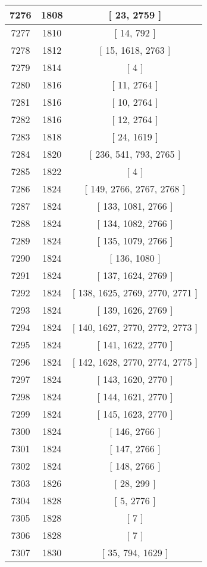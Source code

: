 \begin{center}
\begin{longtable}[H]{|| c c c ||}
\hline
7276 & 1808 & [ 23, 2759 ] \\ 
\hline
7277 & 1810 & [ 14, 792 ] \\ 
\hline
7278 & 1812 & [ 15, 1618, 2763 ] \\ 
\hline
7279 & 1814 & [ 4 ] \\ 
\hline
7280 & 1816 & [ 11, 2764 ] \\ 
\hline
7281 & 1816 & [ 10, 2764 ] \\ 
\hline
7282 & 1816 & [ 12, 2764 ] \\ 
\hline
7283 & 1818 & [ 24, 1619 ] \\ 
\hline
7284 & 1820 & [ 236, 541, 793, 2765 ] \\ 
\hline
7285 & 1822 & [ 4 ] \\ 
\hline
7286 & 1824 & [ 149, 2766, 2767, 2768 ] \\ 
\hline
7287 & 1824 & [ 133, 1081, 2766 ] \\ 
\hline
7288 & 1824 & [ 134, 1082, 2766 ] \\ 
\hline
7289 & 1824 & [ 135, 1079, 2766 ] \\ 
\hline
7290 & 1824 & [ 136, 1080 ] \\ 
\hline
7291 & 1824 & [ 137, 1624, 2769 ] \\ 
\hline
7292 & 1824 & [ 138, 1625, 2769, 2770, 2771 ] \\ 
\hline
7293 & 1824 & [ 139, 1626, 2769 ] \\ 
\hline
7294 & 1824 & [ 140, 1627, 2770, 2772, 2773 ] \\ 
\hline
7295 & 1824 & [ 141, 1622, 2770 ] \\ 
\hline
7296 & 1824 & [ 142, 1628, 2770, 2774, 2775 ] \\ 
\hline
7297 & 1824 & [ 143, 1620, 2770 ] \\ 
\hline
7298 & 1824 & [ 144, 1621, 2770 ] \\ 
\hline
7299 & 1824 & [ 145, 1623, 2770 ] \\ 
\hline
7300 & 1824 & [ 146, 2766 ] \\ 
\hline
7301 & 1824 & [ 147, 2766 ] \\ 
\hline
7302 & 1824 & [ 148, 2766 ] \\ 
\hline
7303 & 1826 & [ 28, 299 ] \\ 
\hline
7304 & 1828 & [ 5, 2776 ] \\ 
\hline
7305 & 1828 & [ 7 ] \\ 
\hline
7306 & 1828 & [ 7 ] \\ 
\hline
7307 & 1830 & [ 35, 794, 1629 ] \\ 

\end{longtable}
\end{center}
